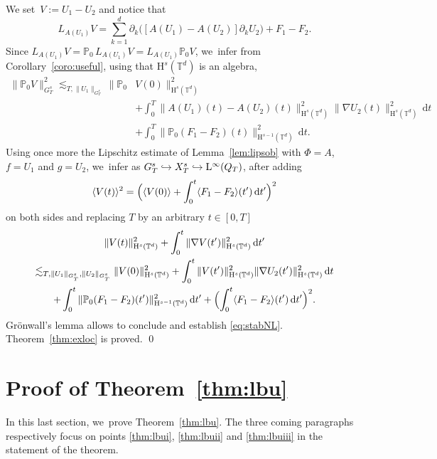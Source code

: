 \documentclass[10pt]{amsart}
\newcommand\hto{\mathrel{\lhook\joinrel\to}}
\theoremstyle{definition}
\newcommand\T{\mathbb{T}}
\newcommand\dd{\mathrm{d}}
\renewcommand\H{\mathrm{H}}
\renewcommand\L{\mathrm{L}}
\begin{document}
We set~$V:=U_1-U_2$ and notice that
\[
L_{A(U_1) }V=\sum_{k=1}^d\partial_k\bigl([A(U_1)-A(U_2)]\partial_k U_2\bigr) + F_1-F_2.
\]
Since $L_{A(U_1) }V = \mathbb{P}_0\,L_{A(U_1) }V = L_{A(U_1)}\mathbb{P}_0 V$, we~infer from Corollary~\ref{coro:useful}, using that $\H^s(\T^d)$ is an algebra,
\[
\begin{aligned}
\|\mathbb{P}_0 V \|_{G_T^s}^2\lesssim_{T, \|U_1\|_{G_T^s}} \|\mathbb{P}_0& V(0)\|_{\H^s(\T^d)}^2\\
& + \int_0^T \|A(U_1)(t)-A(U_2)(t)\|_{\H^s(\T^d)}^2\|\nabla U_2(t)\|_{\H^{s}(\T^d)}^2 \,\dd t \\
& + \int_0^T \|{\mathbb P}_0(F_1-F_2) (t)\|_{\H^{s-1}(\T^d)}^2 \, \dd t.
\end{aligned}
\]
Using once more the Lipschitz estimate of Lemma~\ref{lem:lipsob} with $\Phi=A$, $f=U_1$ and $g=U_2$, we~infer as $G_T^s\hto X_T^s \hto \L^\infty(Q_T)$, after adding
\[
\langle V(t)\rangle^2 = \Bigl(\langle V(0)\rangle+ \int_0^t \langle F_1-F_2 \rangle (t') \, \dd t'\Bigr)^2
\]
on both sides and replacing $T$ by an arbitrary $t\in[0,T]$
\begin{multline*}
\|V(t)\|_{\H^s(\T^d)}^2 + \int_0^t \|\nabla V(t')\|_{\H^s(\T^d)}^2 \,\dd t'\\
\lesssim_{T,\|U_1\|_{G_T^s},\|U_2\|_{G_T^s}} \|V(0)\|_{\H^s(\T^d)}^2+ \int_0^t \|V(t')\|_{\H^s(\T^d)}^2\|\nabla U_2(t')\|_{\H^{s}(\T^d)}^2 \,\dd t \\
+ \int_0^t \|{\mathbb P}_0(F_1-F_2) (t')\|_{\H^{s-1}(\T^d)}^2 \, \dd t ' +\Bigl(\int_0^t \langle F_1-F_2 \rangle (t') \, \dd t'\Bigr)^2.
\end{multline*}
Grönwall's lemma allows to conclude and establish \eqref{eq:stabNL}. Theorem~\ref{thm:exloc}
is proved. \qed

\section{Proof of Theorem~\ref{thm:lbu}}\label{prooflbu}

In this last section, we~prove Theorem~\ref{thm:lbu}. The three coming paragraphs respectively focus on points \eqref{thm:lbui}, \eqref{thm:lbuii} and \eqref{thm:lbuiii} in the statement of the theorem.
\end{document}
